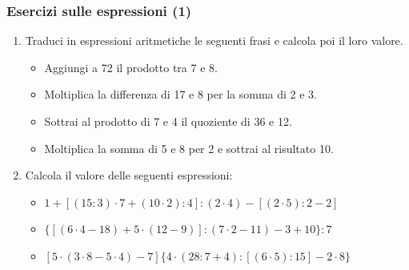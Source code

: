 \documentclass[handout]{beamer}
\theoremstyle{plain}
\begin{document}
\begin{frame}
\frametitle{Esercizi sulle espressioni (1)}
\begin{enumerate}
  \item Traduci in espressioni aritmetiche le seguenti frasi e calcola poi il loro valore.
  \vspace*{.15cm}
  \begin{itemize}
    \item Aggiungi a 72 il prodotto tra 7 e 8.
    \vspace*{.15cm}
    \item Moltiplica la differenza di 17 e 8 per la somma di 2 e 3.
    \vspace*{.15cm}
    \item Sottrai al prodotto di 7 e 4 il quoziente di 36 e 12.
    \vspace*{.15cm}
    \item Moltiplica la somma di 5 e 8 per 2 e sottrai al risultato 10.
  \end{itemize}
  \vspace*{.25cm}
  \item Calcola il valore delle seguenti espressioni:
  \vspace*{.15cm}
  \begin{itemize}
    \item $  1 + [(15 : 3) \cdot 7+ (10 \cdot 2): 4] : (2\cdot4) - [(2\cdot5): 2 - 2] $
    \vspace*{.15cm}
    \item $ \{[(6\cdot 4 - 18) + 5\cdot (12-9)]: (7\cdot 2-11) -3+10\} : 7 $
    \vspace*{.15cm}
    \item $ [5 \cdot (3 \cdot 8-5 \cdot 4) - 7 ] \{4 \cdot (28: 7+4): [(6 \cdot 5): 15] -2 \cdot 8\} $
  \end{itemize}
\end{enumerate}
\end{frame}
\end{document}
